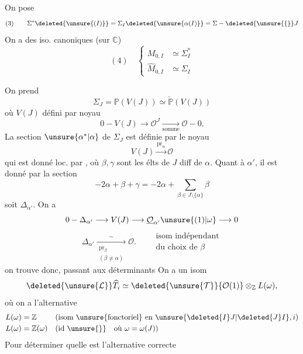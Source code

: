 On pose
\[
(3)\qquad\Sigma^*\deleted{\unsure{(I)}}=\Sigma_I\deleted{\unsure{\alpha(I)}}=\Sigma-\deleted{\unsure{\{}}J
\]
On a des iso. canoniques (sur $\mathbb C$)
\[
(4)\quad\left\{\begin{aligned}
M_{0,I}&\simeq\Sigma_I^*\\
\widehat M_{0,I}&\simeq\Sigma_I
\end{aligned}\right.
\]

On prend
\[
\Sigma_J=\mathbb P(V(J))\simeq\check{\mathbb P}(V(J))
\]
où $V(J)$ défini par noyau
\[
0\mathbin{-}V(J)\longrightarrow\mathcal O^J\xrightarrow[\text{somme}]{}\mathcal O\mathbin{-}0.
\]
La section $\unsure{\alpha^*|\alpha}$ de $\Sigma_J$ est définie par le noyau
\[
V(J)\xrightarrow{\operatorname{pr}_\alpha}\mathcal O
\]
qui est donné  loc. par \deleted{$\unsure{\alpha\mapsto\lambda\beta-\lambda\gamma}$}, où $\beta,\gamma$ sont les élts de $J$ diff de $\alpha$. Quant à $\alpha'$, il est donné par la section
\[
-2\alpha+\beta+\gamma=-2\alpha+\sum_{\beta\in J\setminus\{\alpha\}}\beta
\]
soit $\Delta_{\alpha'}$. On a
\[
0\mathbin{-}\Delta_{\alpha'}\longrightarrow V(J)\longrightarrow\underline{\mathcal O}_{\alpha'}\unsure{(1)|\omega}\longrightarrow0
\]
\[
\Delta_{\alpha'}\xrightarrow[\substack{\operatorname{pr}_\beta\\(\beta\ne\alpha)}]{\sim}\mathcal O.
\qquad\substack{\text{isom indépendant}\\\text{du choix de }\beta}
\]
on trouve donc, passant aux déterminants
On a un isom
\[
\deleted{\unsure{\mathcal L}}\widehat T_i\simeq\deleted{\unsure{\mathcal T}}\{\mathcal O(1)\}\otimes_{\mathbb Z}L(\omega),
\]
où on a l'alternative
\[
\begin{aligned}
L(\omega)&=\mathbb Z&&\text{(isom }\unsure{\text{fonctoriel}}\text{ en }\unsure{\deleted{I}J|\deleted{J}I},i\text{)}\\
L(\omega)&=\mathbb Z(\omega)&&\text{(id}\ \unsure{\}}\quad\text{où }\omega=\omega(J)\text{)}
\end{aligned}
\]
Pour déterminer quelle est l'alternative correcte

